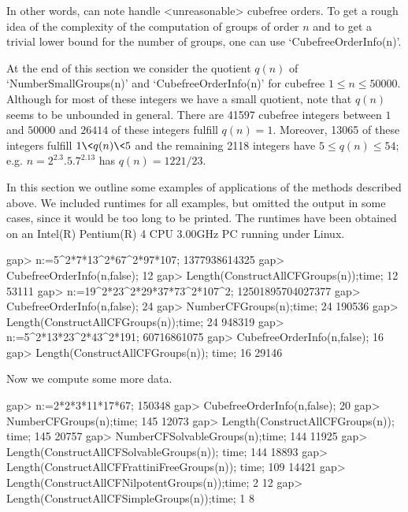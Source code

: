 In other words,  {\Cubefree} can note handle <unreasonable>
cubefree orders. To get a rough idea of the complexity of the computation of
groups of order $n$ and to get a trivial  lower bound for the number of
groups, one can use `CubefreeOrderInfo(n)'.

At the end of this section we consider the quotient $q(n)$ of `NumberSmallGroups(n)'
and  `CubefreeOrderInfo(n)' for cubefree $1\leq n\leq
50000$. Although for most of these integers we have a small quotient, note
that $q(n)$ seems to be unbounded in general. There are 41597 cubefree integers between $1$ and $50000$ and $26414$
of these integers fulfill $q(n)=1$. Moreover, 13065 of these integers fulfill
$1\< q(n)\< 5$ and the remaining 2118 integers have $5\leq q(n)\leq
54$; e.g. $n=2^2.3.5.7^2.13$ has $q(n)=1221/23$. 











In this section we outline some examples of applications of
the methods described above. We
included runtimes for all examples, but omitted the output
in some cases, since it would be too long to be printed.
The runtimes have been obtained on an Intel(R) Pentium(R) 4 CPU 3.00GHz PC running under Linux.

\beginexample
gap> n:=5^2*7*13^2*67^2*97*107;
1377938614325
gap> CubefreeOrderInfo(n,false);
12
gap> Length(ConstructAllCFGroups(n));time;
12
53111
\endexample
\beginexample
gap> n:=19^2*23^2*29*37*73^2*107^2;
12501895704027377
gap> CubefreeOrderInfo(n,false);
24
gap> NumberCFGroups(n);time;
24
190536
gap> Length(ConstructAllCFGroups(n));time;
24
948319
\endexample
\beginexample
gap> n:=5^2*13*23^2*43^2*191;
60716861075
gap> CubefreeOrderInfo(n,false);
16
gap> Length(ConstructAllCFGroups(n)); time;
16
29146
\endexample

Now we compute some more data.

\beginexample
gap>  n:=2*2*3*11*17*67;
150348
gap> CubefreeOrderInfo(n,false);
20
gap> NumberCFGroups(n);time;
145
12073
gap> Length(ConstructAllCFGroups(n)); time;
145
20757
gap> NumberCFSolvableGroups(n);time;
144
11925
gap> Length(ConstructAllCFSolvableGroups(n)); time;
144
18893
gap> Length(ConstructAllCFFrattiniFreeGroups(n)); time;
109
14421
gap> Length(ConstructAllCFNilpotentGroups(n));time;
2
12
gap> Length(ConstructAllCFSimpleGroups(n));time;
1
8
\endexample



